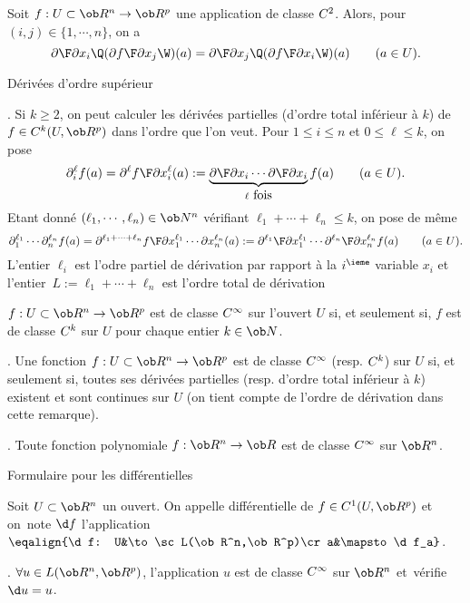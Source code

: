 Soit $f:U\subset\ob R^n\to\ob R^p$ une application de classe $\sc C^2$. 
Alors, pour~$(i,j)\in\{1,\cdots ,n\}$, on a 
$$
{\partial\F\partial x_i}\Q({\partial f\F\partial x_j}\W)(a)={\partial\F\partial x_j}\Q({\partial f\F\partial x_i}\W)(a)\qquad(a\in U). 
$$


\Concept [] D\'eriv\'ees d'ordre sup\'erieur

\Remarque. Si $k\ge2$, on peut calculer les d\'eriv\'ees partielles (d'ordre total inf\'erieur \`a $k$) 
de~$f\in\sc C^k(U,\ob R^p)$ dans l'ordre que l'on veut. 
Pour $1\le i\le n$ et $0\le\ell\le k$, on pose 
$$
\partial_i^\ell f(a)={\partial^\ell f\F\partial x_i^\ell}(a)
:=\underbrace{{\partial\F\partial x_i}\cdots{\partial\F\partial x_i}}_{\ell\mbox{ fois}}f(a)\qquad(a\in U). 
$$
Etant donn\'e $(\ell_1,\cdots,\ell_n)\in\ob N^n$ 
v\'erifiant $\ell_1+\cdots+\ell_n\le k$, on pose de m\^eme 
$$
\partial_1^{\ell_1}\cdots\partial_n^{\ell_n}f(a)={\partial^{\ell_1+\cdots+\ell_n}f\F\partial x_1^{\ell_1}\cdots\partial x_n^{\ell_n}}(a):=
{\partial^{\ell_1}\F\partial x_1^{\ell_1}}\cdots{\partial^{\ell_n}\F\partial x_n^{\ell_n}}f(a)\qquad(a\in U). 
$$
L'entier $\ell_i$ est l'odre partiel de d\'erivation par rapport \`a 
la $i^\ieme$ variable $x_i$ 
et l'entier~$L:=\ell_1+\cdots+\ell_n$ est l'ordre total de d\'erivation 
\bigskip

\Definition []  $f:U\subset\ob R^n\to\ob R^p$ est de classe $\sc C^\infty$ 
sur l'ouvert $U$ si, et seulement si, $f$ est de classe $\sc C^k$ sur $U$ 
pour chaque entier $k\in\ob N$. 
\bigskip

\Remarque. Une fonction $f:U\subset\ob R^n\to\ob R^p$ est de classe $\sc C^\infty$ 
(resp. $\sc C^k$) sur $U$ si, et seulement si, toutes ses d\'eriv\'ees partielles 
(resp. d'ordre total inf\'erieur \`a $k$) existent et sont continues sur $U$ 
(on tient compte de l'ordre de d\'erivation dans cette remarque). 
\bigskip

\Exemple.  Toute fonction polynomiale $f:\ob R^n\to\ob R$ est de classe $\sc C^\infty$ 
sur $\ob R^n$. 
\bigskip


\Concept [] Formulaire pour les diff\'erentielles

\Definition []  Soit $U\subset\ob R^n$ un ouvert. 
On appelle diff\'erentielle de $f\in\sc C^1(U,\ob R^p)$ et on~note $\d f$ 
l'application $\eqalign{\d f: U&\to\sc L(\ob R^n,\ob R^p)\cr  a&\mapsto \d f_a}$.
\bigskip

\Exemple.  $\forall u\in\sc L(\ob R^n,\ob R^p)$, l'application $u$ 
est de classe $\sc C^\infty$ sur $\ob R^n$ et~v\'erifie~$\d u=u$. 
\bigskip 

